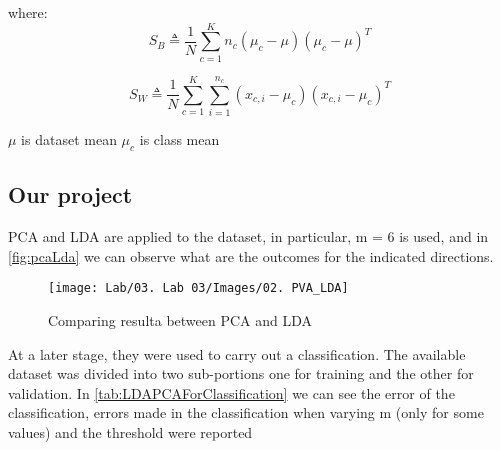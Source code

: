 where:
\begin{equation}
    S_B  \triangleq \frac{1}{N}\sum_{c=1}^{K} n_c (\mu_c - \mu)(\mu_c - \mu)^T
    \label{eq:betweenClass}
\end{equation}

\begin{equation}
    S_W \triangleq \frac{1}{N}\sum_{c=1}^{K} \sum_{i=1}^{n_c} (x_{c,i} - \mu_c)(x_{c,i} - \mu_c)^T
    \label{eq:withinClass}
\end{equation}

\(\mu\) is dataset mean
\(\mu_{c}\) is class mean


\subsection{Our project}
\label{subsec:ourProject}
PCA and LDA are applied to the dataset, in particular, m = 6 is used, and in \autoref{fig:pcaLda} we can observe
what are the outcomes for the indicated directions.

\begin{figure}[h]
    \centering
    \texttt{[image: Lab/03. Lab 03/Images/02. PVA\_LDA]}
    \caption{Comparing resulta between PCA and LDA}
    \label{fig:pcaLda}
\end{figure}

At a later stage, they were used to carry out a classification.
The available dataset was divided into two sub-portions one for training and the other for validation.
In \autoref{tab:LDAPCAForClassification} we can see the error of the classification,
errors made in the classification when varying m (only for some values) and the threshold were reported

